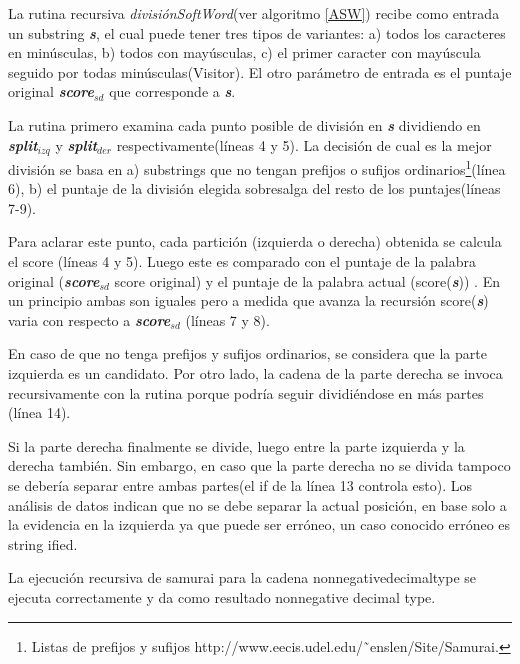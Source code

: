 \documentclass[a4paper,12pt]{report}
\begin{document}
La rutina recursiva \textit{divisiónSoftWord}(ver algoritmo \ref{ASW}) recibe como entrada un substring \textbf{\textit{s}}, el cual puede tener tres tipos de variantes: a) todos los caracteres en minúsculas, b) todos con mayúsculas, c) el primer caracter con mayúscula seguido por todas minúsculas(\textsf{Visitor}). El otro parámetro de entrada es el puntaje original \textbf{\textit{score$_{sd}$}} que corresponde a  \textbf{\textit{s}}.

La rutina primero examina cada punto posible de división en \textbf{\textit{s}} dividiendo en \textbf{\textit{split$_{izq}$}} y \textbf{\textit{split$_{der}$}} respectivamente(líneas 4 y 5). La decisión de cual es la mejor división se basa en a) substrings que no tengan prefijos o sufijos ordinarios\footnote[1]{Listas de prefijos y sufijos  http://www.eecis.udel.edu/˜enslen/Site/Samurai.}(línea 6), b) el puntaje de la división elegida sobresalga del resto de los puntajes(líneas 7-9). 

Para aclarar este punto, cada partición (izquierda o derecha) obtenida se calcula el score (líneas 4 y 5). Luego este es comparado con el puntaje de la palabra original (\textbf{\textit{score$_{sd}$}} score original) y el puntaje de la palabra actual (score(\textbf{\textit{s}})) . En un principio ambas son iguales pero a medida que avanza la recursión score(\textbf{\textit{s}}) varia con respecto a \textbf{\textit{score$_{sd}$}} (líneas 7 y 8).

En caso de que no tenga prefijos y sufijos ordinarios, se considera que la parte izquierda es un candidato. Por otro lado, la cadena de la parte derecha se invoca recursivamente con la rutina porque podría seguir dividiéndose en más partes (línea 14).

Si la parte derecha finalmente se divide, luego entre la parte izquierda y la derecha también. Sin embargo, en caso que la parte derecha no se divida tampoco se debería separar entre ambas partes(el \textsf{if} de la línea 13 controla esto). Los análisis de datos\cite{EHPV09} indican que no se debe separar la actual posición, en base solo a la evidencia en la izquierda ya que puede ser erróneo, un caso conocido erróneo es \textsf{string ified}. 

La ejecución recursiva de samurai para la cadena \textsf{nonnegativedecimaltype} se ejecuta correctamente y da como resultado \textsf{nonnegative decimal type}\cite{EHPV09}.
\end{document}
